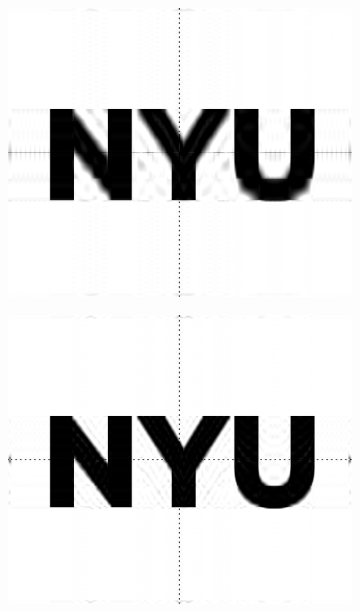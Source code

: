 \documentclass{article}%
\begin{document}
\begin{figure}[H]
\centering
\begin{subfigure}{0.3\textwidth}
\includegraphics[width=\linewidth]{./code/compressed_rank_10.png}
\end{subfigure}
\begin{subfigure}{0.3\textwidth}
    \includegraphics[width=\linewidth]{./code/compressed_rank_20.png}
    \end{subfigure}
    \begin{subfigure}{0.3\textwidth}

\end{subfigure}
\end{figure}
\end{document}
